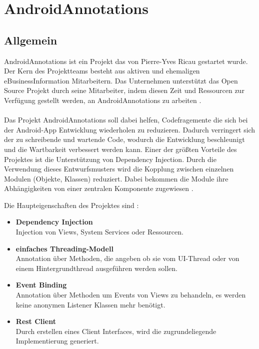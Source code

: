 \newpage
\section{AndroidAnnotations}

\subsection{Allgemein}
AndroidAnnotations ist ein Projekt das von Pierre-Yves Ricau gestartet wurde. Der Kern des Projektteams besteht aus aktiven und ehemaligen eBusinessInformation Mitarbeitern. Das Unternehmen unterstützt das Open Source Projekt durch seine Mitarbeiter, indem diesen Zeit und Ressourcen zur Verfügung gestellt werden, an AndroidAnnotations zu arbeiten \cite{annotation:sponsors}.
\\\\
Das Projekt AndroidAnnotations soll dabei helfen, Codefragemente die sich bei der Android-App Entwicklung wiederholen zu reduzieren. Dadurch verringert sich der zu schreibende und wartende Code, wodurch die Entwicklung beschleunigt und die Wartbarkeit verbessert werden kann. Einer der größten Vorteile des Projektes ist die Unterstützung von Dependency Injection. Durch die Verwendung dieses Entwurfsmusters wird die Kopplung zwischen einzelnen Modulen (Objekte, Klassen) reduziert. Dabei bekommen die Module ihre Abhängigkeiten von einer zentralen Komponente zugewiesen \cite{annotation:spring}.

Die Haupteigenschaften des Projektes sind \cite{annotation:introduction}:

\begin{itemize}
	\item \textbf{Dependency Injection}\\
	Injection von Views, System Services oder Ressourcen.
	\item \textbf{einfaches Threading-Modell}\\
	Annotation über Methoden, die angeben ob sie vom UI-Thread oder von einem Hintergrundthread ausgeführen werden sollen.
	\item \textbf{Event Binding}\\
	Annotation über Methoden um Events von Views zu behandeln, es werden keine anonymen Listener Klassen mehr benötigt.
	\item \textbf{Rest Client}\\
	Durch erstellen eines Client Interfaces, wird die zugrundeliegende Implementierung generiert.
\end{itemize}

